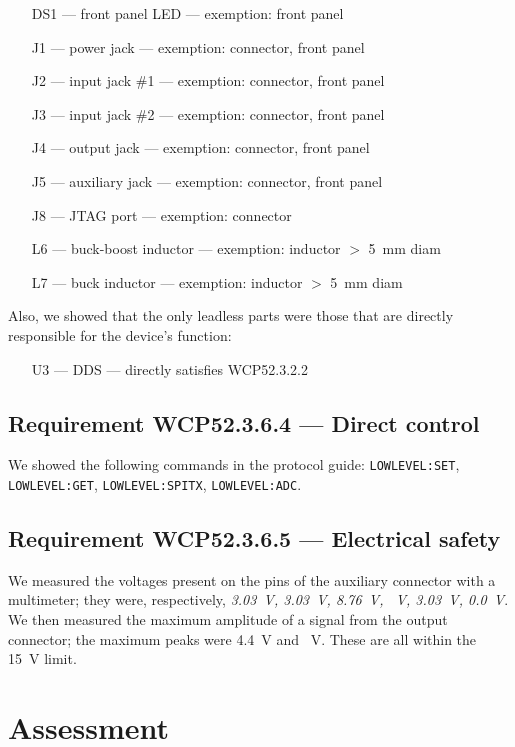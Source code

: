 \begin{itemize}
\item[DS1]{--- front panel LED --- exemption: front panel}
\item[J1]{--- power jack --- exemption: connector, front panel}
\item[J2]{--- input jack \#1 --- exemption: connector, front panel}
\item[J3]{--- input jack \#2 --- exemption: connector, front panel}
\item[J4]{--- output jack --- exemption: connector, front panel}
\item[J5]{--- auxiliary jack --- exemption: connector, front panel}
\item[J8]{--- JTAG port --- exemption: connector}
\item[L6]{--- buck-boost inductor --- exemption: inductor $>$ 5~mm diam}
\item[L7]{--- buck inductor --- exemption: inductor $>$ 5~mm diam}
\end{itemize}

Also, we showed that the only leadless parts were those that are directly responsible for the device's function:

\begin{itemize}
\item[U3]{--- DDS --- directly satisfies WCP52.3.2.2}
\end{itemize}

\subsection*{Requirement WCP52.3.6.4 --- Direct control}
We showed the following commands in the protocol guide: \texttt{LOWLEVEL:SET}, \texttt{LOWLEVEL:GET},
\texttt{LOWLEVEL:SPITX}, \texttt{LOWLEVEL:ADC}.

\subsection*{Requirement WCP52.3.6.5 --- Electrical safety}
We measured the voltages present on the pins of the auxiliary connector with a multimeter;
they were, respectively, \emph{3.03~V, 3.03~V, 8.76~V, ~V, 3.03~V, 0.0~V}. We then
measured the maximum amplitude of a signal from the output connector; the maximum peaks were
4.4~V and ~V. These are all within the 15~V limit.

\section{Assessment}

